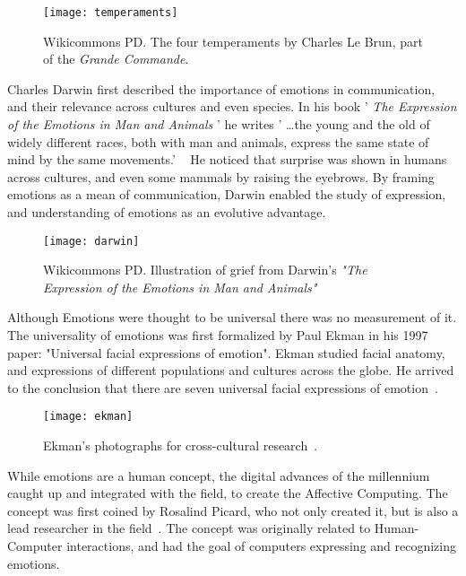 \begin{figure}[H]
  \texttt{[image: temperaments]}
  \centering
  \caption{Wikicommons PD. The four temperaments by Charles Le Brun, part of the \emph{Grande Commande}.}\label{fig:temperaments}
\end{figure}

Charles Darwin first described the importance of emotions in communication, and their relevance across cultures and even species. In his book ' \emph{The Expression of the Emotions in Man and Animals} ' he writes ' \ldots the young and the old of widely different races, both with man and animals, express the same state of mind by the same movements.' ~\cite{darwin1872emotions} He noticed that surprise was shown in humans across cultures, and even some mammals by raising the eyebrows. By framing emotions as a mean of communication, Darwin enabled the study of expression, and understanding of emotions as an evolutive advantage.

\begin{figure}[H]
  \texttt{[image: darwin]}
  \centering
  \caption{Wikicommons PD. Illustration of grief from Darwin's \emph{"The Expression of the Emotions in Man and Animals"}}\label{fig:darwin}
\end{figure}

Although Emotions were thought to be universal there was no measurement of it. The universality of emotions was first formalized by Paul Ekman in his 1997 paper: "Universal facial expressions of emotion". Ekman studied facial anatomy, and expressions of different populations and cultures across the globe. He arrived to the conclusion that there are seven universal facial expressions of emotion~\cite{ekman1997universal}.

\begin{figure}[H]
  \texttt{[image: ekman]}
  \centering
  \caption{Ekman's photographs for cross-cultural research~\cite{ekman1999facial}.}\label{fig:ekman}
\end{figure}

While emotions are a human concept, the digital advances of the millennium caught up and integrated with the field, to create the Affective Computing. The concept was first coined by Rosalind Picard, who not only created it, but is also a lead researcher in the field~\cite{picard2000affective}. The concept was originally related to Human-Computer interactions, and had the goal of computers expressing and recognizing emotions.


